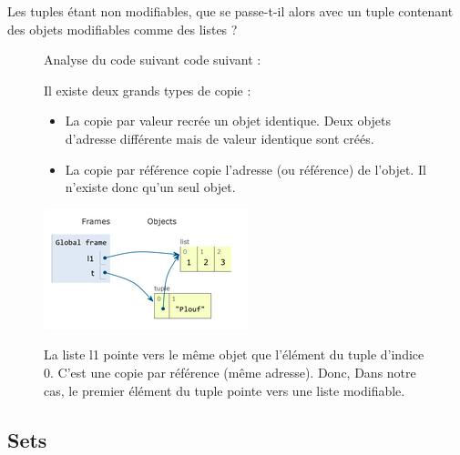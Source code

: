 \begin{tcolorbox}[lefttitle=2cm, colframe=gray!75!blue, title= \textbf{Tip for Code 3 : psychologie d'un tuple}]

Les tuples étant non modifiables, que se passe-t-il alors avec un tuple contenant des objets modifiables comme des listes ? 
\begin{figure}[H]
    \begin{minipage}[c]{0.53\textwidth}
Analyse du code suivant code suivant :


    \end{minipage}\hfill
    \begin{minipage}[c]{0.45\textwidth}

Il existe deux grands types de copie :
\begin{itemize}
    \item La copie par valeur recrée un objet identique. Deux objets d'adresse différente mais de valeur identique sont créés.
    \item La copie par référence copie l'adresse (ou référence) de l'objet. Il n'existe donc qu'un seul objet.
\end{itemize}

    \begin{center}
    \includegraphics[scale=0.7]{chapitre2/figures/memoire.png}    
    \end{center}
    
    
La liste l1 pointe vers le même objet que l'élément du tuple d'indice 0. C'est une copie par référence (même adresse).
Donc, Dans notre cas, le premier élément du tuple pointe vers une liste modifiable. 

    \end{minipage}
\end{figure}

\end{tcolorbox}




\subsection{Sets}

